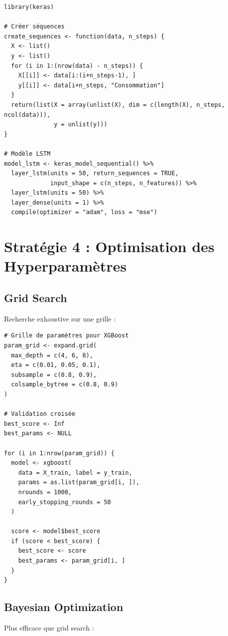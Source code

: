 \documentclass[12pt,a4paper]{article}
\begin{document}
\begin{verbatim}
library(keras)

# Créer séquences
create_sequences <- function(data, n_steps) {
  X <- list()
  y <- list()
  for (i in 1:(nrow(data) - n_steps)) {
    X[[i]] <- data[i:(i+n_steps-1), ]
    y[[i]] <- data[i+n_steps, "Consommation"]
  }
  return(list(X = array(unlist(X), dim = c(length(X), n_steps, ncol(data))),
              y = unlist(y)))
}

# Modèle LSTM
model_lstm <- keras_model_sequential() %>%
  layer_lstm(units = 50, return_sequences = TRUE, 
             input_shape = c(n_steps, n_features)) %>%
  layer_lstm(units = 50) %>%
  layer_dense(units = 1) %>%
  compile(optimizer = "adam", loss = "mse")
\end{verbatim}

\section{Stratégie 4 : Optimisation des Hyperparamètres}

\subsection{Grid Search}

Recherche exhaustive sur une grille :

\begin{verbatim}
# Grille de paramètres pour XGBoost
param_grid <- expand.grid(
  max_depth = c(4, 6, 8),
  eta = c(0.01, 0.05, 0.1),
  subsample = c(0.8, 0.9),
  colsample_bytree = c(0.8, 0.9)
)

# Validation croisée
best_score <- Inf
best_params <- NULL

for (i in 1:nrow(param_grid)) {
  model <- xgboost(
    data = X_train, label = y_train,
    params = as.list(param_grid[i, ]),
    nrounds = 1000,
    early_stopping_rounds = 50
  )
  
  score <- model$best_score
  if (score < best_score) {
    best_score <- score
    best_params <- param_grid[i, ]
  }
}
\end{verbatim}

\subsection{Bayesian Optimization}

Plus efficace que grid search :
\end{document}
